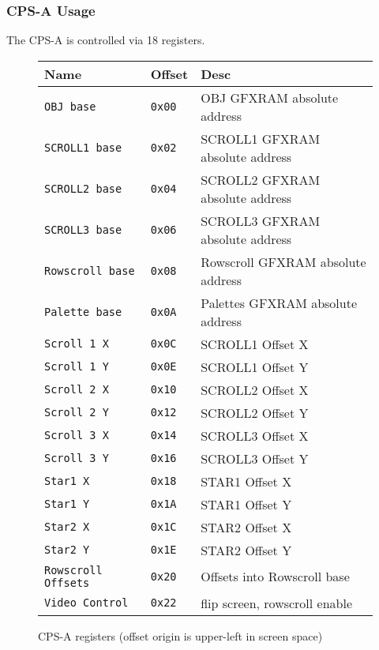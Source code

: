 \subsubsection{CPS-A Usage}

The CPS-A is controlled via 18 registers.

 \begin{figure}[H]
\begin{tabularx}{\textwidth}{llX}
  \toprule    
  \textbf{Name } & \textbf{ Offset }  & \textbf{Desc }  \\     
  \toprule   
  \texttt{OBJ base}  &  \texttt{0x00} & OBJ GFXRAM absolute address   \\   
\texttt{SCROLL1 base} &  \texttt{0x02}  & SCROLL1 GFXRAM absolute address   \\         
\texttt{SCROLL2 base} &  \texttt{0x04}  & SCROLL2 GFXRAM absolute address   \\     
\texttt{SCROLL3 base}&  \texttt{0x06}   & SCROLL3 GFXRAM absolute address  \\     
\texttt{Rowscroll base} &  \texttt{0x08}  & Rowscroll GFXRAM absolute address \\     
\texttt{Palette base} &  \texttt{0x0A}  & Palettes GFXRAM absolute address  \\   
  \toprule   
\texttt{Scroll 1 X} &  \texttt{0x0C}  & SCROLL1 Offset X  \\ 
\texttt{Scroll 1 Y} &  \texttt{0x0E}  & SCROLL1 Offset Y    \\   
\texttt{Scroll 2 X} &  \texttt{0x10}  & SCROLL2 Offset X    \\ 
\texttt{Scroll 2 Y} &  \texttt{0x12}  & SCROLL2 Offset Y    \\   
\texttt{Scroll 3 X} &  \texttt{0x14}  & SCROLL3 Offset X    \\ 
\texttt{Scroll 3 Y} &  \texttt{0x16}  & SCROLL3 Offset Y    \\     
  \toprule   
\texttt{Star1    X} &  \texttt{0x18}  & STAR1   Offset X    \\  
\texttt{Star1    Y} &  \texttt{0x1A}  & STAR1   Offset Y    \\  
\texttt{Star2    X} &  \texttt{0x1C}  & STAR2   Offset X    \\  
\texttt{Star2    Y} &  \texttt{0x1E}  & STAR2   Offset Y    \\  
  \toprule   
\texttt{Rowscroll Offsets} &  \texttt{0x20}  & Offsets into Rowscroll base\\
\texttt{Video Control} &  \texttt{0x22}  & flip screen, rowscroll enable\\
  \toprule   
\end{tabularx}
\caption*{CPS-A registers (offset origin is upper-left in screen space)}
\end{figure}

